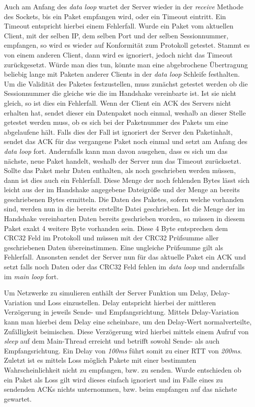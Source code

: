 Auch am Anfang des \textit{data loop} wartet der Server wieder in der \textit{receive} Methode des Sockets, bis ein Paket empfangen wird, oder ein Timeout eintritt.
Ein Timeout entspricht hierbei einem Fehlerfall.
Wurde ein Paket vom aktuellen Client, mit der selben IP, dem selben Port und der selben Sessionnummer, empfangen, so wird es wieder auf Konformität zum Protokoll getestet.
Stammt es von einem anderen Client, dann wird es ignoriert, jedoch nicht das Timeout zurückgesetzt.
Würde man dies tun, könnte man eine abgebrochene Übertragung beliebig lange mit Paketen anderer Clients in der \textit{data loop} Schleife festhalten.
Um die Validität des Paketes festzustellen, muss zunächst getestet werden ob die Sessionnummer die gleiche wie die im Handshake vereinbarte ist.
Ist sie nicht gleich, so ist dies ein Fehlerfall.
Wenn der Client ein ACK des Servers nicht erhalten hat, sendet dieser ein Datenpaket noch einmal, weshalb an dieser Stelle getestet werden muss, ob es sich bei der Paketnummer des Pakets um eine abgelaufene hält.
Falls dies der Fall ist ignoriert der Server den Paketinhalt, sendet das ACK für das vergangene Paket noch einmal und setzt am Anfang des \textit{data loop} fort.
Andernfalls kann man davon ausgehen, dass es sich um das nächste, neue Paket handelt, weshalb der Server nun das Timeout zurücksetzt.
Sollte das Paket mehr Daten enthalten, als noch geschrieben werden müssen, dann ist dies auch ein Fehlerfall.
Diese Menge der noch fehlenden Bytes lässt sich leicht aus der im Handshake angegebene Dateigröße und der Menge an bereits geschriebenen Bytes ermitteln.
Die Daten des Paketes, sofern welche vorhanden sind, werden nun in die bereits erstellte Datei geschrieben.
Ist die Menge der im Handshake vereinbarten Daten bereits geschrieben worden, so müssen in diesem Paket exakt 4 weitere Byte vorhanden sein.
Diese 4 Byte entsprechen dem CRC32 Feld im Protokoll und müssen mit der CRC32 Prüfsumme aller geschriebenen Daten übereinstimmen.
Eine ungleiche Prüfsumme gilt als Fehlerfall.
Ansonsten sendet der Server nun für das aktuelle Paket ein ACK und setzt falls noch Daten oder das CRC32 Feld fehlen im \textit{data loop} und andernfalls im \textit{main loop} fort. \newline

Um Netzwerke zu simulieren enthält der Server Funktion um Delay, Delay-Variation und Loss einzustellen.
Delay entspricht hierbei der mittleren Verzögerung in jeweils Sende- und Empfangsrichtung.
Mittels Delay-Variation kann man hierbei dem Delay eine scheinbare, um den Delay-Wert normalverteilte, Zufälligkeit beimischen.
Diese Verzögerung wird hierbei mittels einem Aufruf von \textit{sleep} auf dem Main-Thread erreicht und betrifft sowohl Sende- als auch Empfangsrichtung.
Ein Delay von \textit{100ms} führt somit zu einer RTT von \textit{200ms}.
Zuletzt ist es mittels Loss möglich Pakete mit einer bestimmten Wahrscheinlichkeit nicht zu empfangen, bzw. zu senden.
Wurde entschieden ob ein Paket als Loss gilt wird dieses einfach ignoriert und im Falle eines zu sendenden ACKs nichts unternommen, bzw. beim empfangen auf das nächste gewartet. \newline

